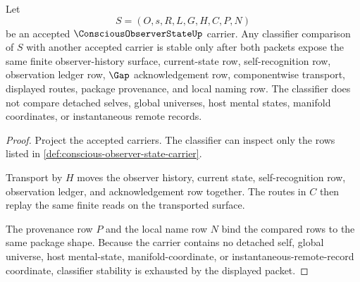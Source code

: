 \begin{theorem}
\label{thm:conscious-observer-state-classifier-stability}
Let
$$
S=(O,s,R,L,G,H,C,P,N)
$$
be an accepted $\ConsciousObserverStateUp$ carrier. Any classifier comparison of $S$ with another accepted carrier is stable only after both packets expose the same finite observer-history surface, current-state row, self-recognition row, observation ledger row, $\Gap$ acknowledgement row, componentwise transport, displayed routes, package provenance, and local naming row. The classifier does not compare detached selves, global universes, host mental states, manifold coordinates, or instantaneous remote records.
\end{theorem}
\begin{proof}
Project the accepted carriers. The classifier can inspect only the rows listed in \autoref{def:conscious-observer-state-carrier}.

Transport by $H$ moves the observer history, current state, self-recognition row, observation ledger, and acknowledgement row together. The routes in $C$ then replay the same finite reads on the transported surface.

The provenance row $P$ and the local name row $N$ bind the compared rows to the same package shape. Because the carrier contains no detached self, global universe, host mental-state, manifold-coordinate, or instantaneous-remote-record coordinate, classifier stability is exhausted by the displayed packet.
\end{proof}

